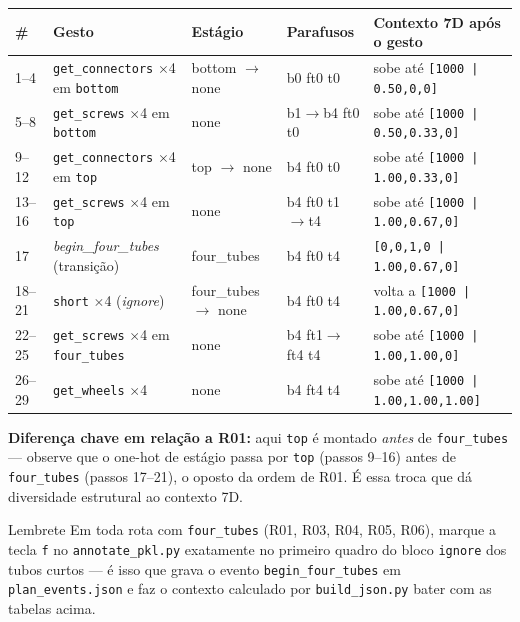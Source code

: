 \documentclass[11pt,a4paper]{article}
\begin{document}
\begin{longtable}{p{0.6cm}p{3.1cm}p{2.6cm}p{2.3cm}p{5.5cm}}
\toprule
\textbf{\#} & \textbf{Gesto} & \textbf{Estágio} & \textbf{Parafusos} & \textbf{Contexto 7D após o gesto} \\
\midrule
\endhead
1--4 & \texttt{get\_connectors} $\times$4 em \texttt{bottom} & bottom $\to$ none & b0 ft0 t0 & sobe até \texttt{[1000\,|\,0.50,0,0]} \\
5--8 & \texttt{get\_screws} $\times$4 em \texttt{bottom} & none & b1$\to$b4 ft0 t0 & sobe até \texttt{[1000\,|\,0.50,0.33,0]} \\
9--12 & \texttt{get\_connectors} $\times$4 em \texttt{top} & top $\to$ none & b4 ft0 t0 & sobe até \texttt{[1000\,|\,1.00,0.33,0]} \\
13--16 & \texttt{get\_screws} $\times$4 em \texttt{top} & none & b4 ft0 t1$\to$t4 & sobe até \texttt{[1000\,|\,1.00,0.67,0]} \\
17 & \textit{begin\_four\_tubes} (transição) & four\_tubes & b4 ft0 t4 & \texttt{[0,0,1,0\,|\,1.00,0.67,0]} \\
18--21 & \texttt{short} $\times$4 (\textit{ignore}) & four\_tubes $\to$ none & b4 ft0 t4 & volta a \texttt{[1000\,|\,1.00,0.67,0]} \\
22--25 & \texttt{get\_screws} $\times$4 em \texttt{four\_tubes} & none & b4 ft1$\to$ft4 t4 & sobe até \texttt{[1000\,|\,1.00,1.00,0]} \\
26--29 & \texttt{get\_wheels} $\times$4 & none & b4 ft4 t4 & sobe até \texttt{[1000\,|\,1.00,1.00,1.00]} \\
\bottomrule
\end{longtable}

\textbf{Diferença chave em relação a R01:} aqui \texttt{top} é montado
\emph{antes} de \texttt{four\_tubes} --- observe que o one-hot de estágio
passa por \texttt{top} (passos 9--16) antes de \texttt{four\_tubes} (passos
17--21), o oposto da ordem de R01. É essa troca que dá diversidade
estrutural ao contexto 7D.

\begin{warningbox}{Lembrete}
Em toda rota com \texttt{four\_tubes} (R01, R03, R04, R05, R06), marque a
tecla \texttt{f} no \texttt{annotate\_pkl.py} exatamente no primeiro quadro
do bloco \texttt{ignore} dos tubos curtos --- é isso que grava o evento
\texttt{begin\_four\_tubes} em \texttt{plan\_events.json} e faz o contexto
calculado por \texttt{build\_json.py} bater com as tabelas acima.
\end{warningbox}
\end{document}
